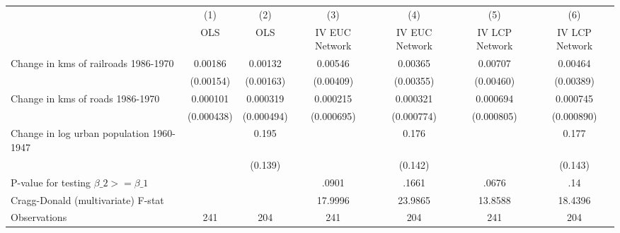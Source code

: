 {
\def\sym#1{\ifmmode^{#1}\else\(^{#1}\)\fi}
\begin{tabular}{l*{6}{c}}
\hline\hline
                &\multicolumn{1}{c}{(1)}&\multicolumn{1}{c}{(2)}&\multicolumn{1}{c}{(3)}&\multicolumn{1}{c}{(4)}&\multicolumn{1}{c}{(5)}&\multicolumn{1}{c}{(6)}\\
                &\multicolumn{1}{c}{OLS}&\multicolumn{1}{c}{OLS}&\multicolumn{1}{c}{IV EUC Network}&\multicolumn{1}{c}{IV EUC Network}&\multicolumn{1}{c}{IV LCP Network}&\multicolumn{1}{c}{IV LCP Network}\\
\hline
Change in kms of railroads 1986-1970&  0.00186         &  0.00132         &  0.00546         &  0.00365         &  0.00707         &  0.00464         \\
                &(0.00154)         &(0.00163)         &(0.00409)         &(0.00355)         &(0.00460)         &(0.00389)         \\
[1em]
Change in kms of roads 1986-1970& 0.000101         & 0.000319         & 0.000215         & 0.000321         & 0.000694         & 0.000745         \\
                &(0.000438)         &(0.000494)         &(0.000695)         &(0.000774)         &(0.000805)         &(0.000890)         \\
[1em]
Change in log urban population 1960-1947&                  &    0.195         &                  &    0.176         &                  &    0.177         \\
                &                  &  (0.139)         &                  &  (0.142)         &                  &  (0.143)         \\
\hline
P-value for testing $\beta\_{2} >= \beta\_{1}$&                  &                  &    .0901         &    .1661         &    .0676         &      .14         \\
Cragg-Donald (multivariate) F-stat&                  &                  &  17.9996         &  23.9865         &  13.8588         &  18.4396         \\
Observations    &      241         &      204         &      241         &      204         &      241         &      204         \\
\hline\hline
\end{tabular}
}
